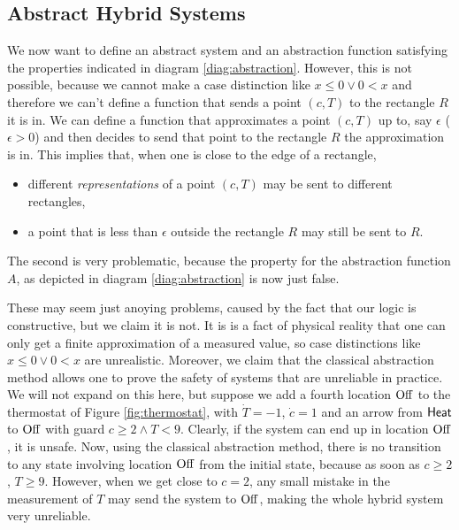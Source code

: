 \documentclass[runningheads]{llncs}
\newcommand{\Heat}{{\sf Heat}}
\newcommand{\Off}{{\rm Off}}
\begin{document}
\subsection{Abstract Hybrid Systems}
\label{abshybsys}
\label{abstraction}
We now want to define an abstract system and an abstraction function
satisfying the properties indicated in diagram
\ref{diag:abstraction}. However, this is not possible, because we
cannot make a case distinction like $x\leq 0 \vee 0< x$ and therefore
we can't define a function that sends a point $(c,T)$ to the rectangle $R$
it is in. We can define a function that approximates a point $(c,T)$
up to, say $\epsilon$ ($\epsilon >0$) and then decides to send that
point to the rectangle $R$ the approximation is in. This implies that,
when one is close to the edge of a rectangle,
\begin{itemize}
\item 
different {\em representations\/} of a point $(c,T)$ may be
sent to different rectangles,
\item
a point that is less than $\epsilon$ outside the rectangle $R$ may still be sent to $R$.
\end{itemize}
The second is very problematic, because the property for the
abstraction function $A$, as depicted in diagram
\ref{diag:abstraction} is now just false.

These may seem just anoying problems,
caused by the fact that our logic is constructive, but we claim it is
not. It is is a fact of physical reality that one can only get a
finite approximation of a measured value, so case distinctions like
$x\leq 0 \vee 0< x$ are unrealistic. Moreover, we claim that the
classical abstraction method allows one to prove the safety of systems
that are unreliable in practice. We will not expand on this here, but
suppose we add a fourth location $\Off$ to the thermostat of Figure
\ref{fig:thermostat}, with $\dot{T} = -1$, $\dot{c} =1$ and an arrow
from $\Heat$ to $\Off$ with guard $c\geq 2 \wedge T<9$. Clearly, if
the system can end up in location $\Off$, it is unsafe. Now, using
the classical abstraction method, there is no transition to any state
involving location $\Off$ from the initial state, because as soon as
$c\geq 2$, $T\geq 9$. However, when we get close to $c=2$, any small
mistake in the measurement of $T$ may send the system to $\Off$,
making the whole hybrid system very unreliable.
\end{document}
